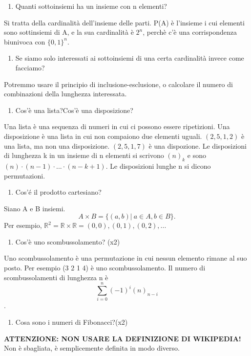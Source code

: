 \begin{enumerate}[resume]\bfseries
	\item Quanti sottoinsiemi ha un insieme con n elementi?
\end{enumerate}
Si tratta della cardinalità dell'insieme delle parti. P(A) è l'insieme i cui elementi sono sottinsiemi di A, e la sua cardinalità è $2^n$, perchè c'è una corrispondenza biunivoca con $\{0,1\}^n$.
\begin{enumerate}[resume]\bfseries
	\item Se siamo solo interessati ai sottoinsiemi di una certa cardinalità invece come facciamo?
\end{enumerate}
Potremmo usare il principio di inclusione-esclusione, o calcolare il numero di combinazioni della lunghezza interessata.
\begin{enumerate}[resume]\bfseries
\item Cos'è una lista?Cos'è una disposizione?
\end{enumerate}
Una lista è una sequenza di numeri in cui ci possono essere ripetizioni. Una disposizione è una lista in cui non compaiono due elementi uguali.\newline
$(2,5,1,2)$ è una lista, ma non una disposizione. $(2,5,1,7)$ è una dispozione. Le disposizioni di lunghezza k in un insieme di n elementi  si scrivono $(n)_k$ e sono $(n) \cdot (n-1) \cdot ... \cdot (n-k+1)$. Le disposizioni lunghe n si dicono permutazioni.
\begin{enumerate}[resume]\bfseries
\item Cos'é il prodotto cartesiano?
\end{enumerate}
Siano A e B insiemi.\newline
\[A \times B = \{(a,b) \vert \:a \in A, b \in B\}. \]
Per esempio, $\mathbb{R}^2 = \mathbb{R} \times \mathbb{R} = (0,0), (0,1), (0,2), ...$
\begin{enumerate}[resume]\bfseries
\item Cos'è uno scombussolamento? (x2)
\end{enumerate}
Uno scombussolamento è una permutazione in cui nessun elemento rimane al suo posto. Per esempio (3 2 1 4) è uno scombussolamento. Il numero di scombussolamenti di lunghezza n è \[\sum_{i=0}^{n} (-1)^i(n)_{n-i}\].
 \begin{enumerate}[resume]\bfseries
	\item Cosa sono i numeri di Fibonacci?(x2)
\end{enumerate}
\textbf{ATTENZIONE: NON USARE LA DEFINIZIONE DI WIKIPEDIA!} \newline Non è sbagliata, è semplicemente definita in modo diverso.\newline
